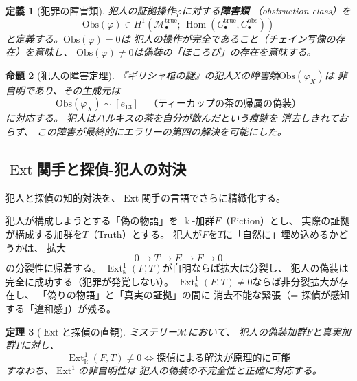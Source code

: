\documentclass[12pt,twocolumn]{ltjsarticle}
\newtheorem{theorem}{定理}[section]
\newtheorem{proposition}[theorem]{命題}
\newtheorem{definition}[theorem]{定義}
\newcommand{\Hom}{\operatorname{Hom}}
\newcommand{\Ext}{\operatorname{Ext}}
\newcommand{\Mys}{\mathcal{M}}
\newcommand{\kk}{\Bbbk}
\begin{document}
\begin{definition}[犯罪の障害類]
犯人の証拠操作$\varphi$に対する\textbf{障害類}
（obstruction class）を
\begin{equation}
\text{Obs}(\varphi) \in H^1(\Mys^{\text{true}}_\bullet;\,
\Hom(C_\bullet^{\text{true}}, C_\bullet^{\text{obs}}))
\end{equation}
と定義する。$\text{Obs}(\varphi) = 0$は
犯人の操作が完全であること（チェイン写像の存在）を意味し、
$\text{Obs}(\varphi) \neq 0$は偽装の「ほころび」の存在を意味する。
\end{definition}

\begin{proposition}[犯人の障害定理]
\label{prop:criminal_obstruction}
『ギリシャ棺の謎』の犯人Xの障害類$\text{Obs}(\varphi_X)$は
非自明であり、その生成元は
\begin{equation}
\text{Obs}(\varphi_X) \sim [e_{13}]
\quad \text{（ティーカップの茶の帰属の偽装）}
\end{equation}
に対応する。
犯人はハルキスの茶を自分が飲んだという痕跡を
消去しきれておらず、
この障害が最終的にエラリーの第四の解決を可能にした。
\end{proposition}


\subsection{$\Ext$関手と探偵-犯人の対決}

犯人と探偵の知的対決を、$\Ext$関手の言語でさらに精緻化する。

犯人が構成しようとする「偽の物語」を
$\kk$-加群$F$（Fiction）とし、
実際の証拠が構成する加群を$T$（Truth）とする。
犯人が$F$を$T$に「自然に」埋め込めるかどうかは、
拡大
\begin{equation}
0 \to T \to E \to F \to 0
\end{equation}
の分裂性に帰着する。
$\Ext^1_\kk(F, T)$が自明ならば拡大は分裂し、
犯人の偽装は完全に成功する（犯罪が発覚しない）。
$\Ext^1_\kk(F, T) \neq 0$ならば非分裂拡大が存在し、
「偽りの物語」と「真実の証拠」の間に
消去不能な緊張（= 探偵が感知する「違和感」）が残る。

\begin{theorem}[$\Ext$と探偵の直観]
\label{thm:ext_detective}
ミステリー$\Mys$において、
犯人の偽装加群$F$と真実加群$T$に対し、
\begin{equation}
\Ext^1_\kk(F, T) \neq 0
\iff \text{探偵による解決が原理的に可能}
\end{equation}
すなわち、$\Ext^1$の非自明性は
犯人の偽装の不完全性と正確に対応する。
\end{theorem}
\end{document}
